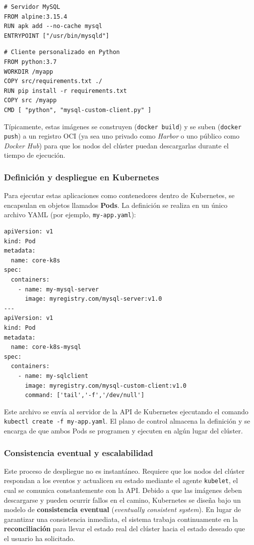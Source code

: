 \begin{verbatim}
# Servidor MySQL
FROM alpine:3.15.4
RUN apk add --no-cache mysql
ENTRYPOINT ["/usr/bin/mysqld"]
\end{verbatim}

\begin{verbatim}
# Cliente personalizado en Python
FROM python:3.7
WORKDIR /myapp
COPY src/requirements.txt ./
RUN pip install -r requirements.txt
COPY src /myapp
CMD [ "python", "mysql-custom-client.py" ]
\end{verbatim}

Típicamente, estas imágenes se construyen (\texttt{docker build}) y se suben (\texttt{docker push}) a un registro OCI (ya sea uno privado como \textit{Harbor} o uno público como \textit{Docker Hub}) para que los nodos del clúster puedan descargarlas durante el tiempo de ejecución.

\subsubsection{Definición y despliegue en Kubernetes}
Para ejecutar estas aplicaciones como contenedores dentro de Kubernetes, se encapsulan en objetos llamados \textbf{Pods}. La definición se realiza en un único archivo YAML (por ejemplo, \texttt{my-app.yaml}):

\begin{verbatim}
apiVersion: v1
kind: Pod
metadata:
  name: core-k8s
spec:
  containers:
    - name: my-mysql-server
      image: myregistry.com/mysql-server:v1.0
---
apiVersion: v1
kind: Pod
metadata:
  name: core-k8s-mysql
spec:
  containers:
    - name: my-sqlclient
      image: myregistry.com/mysql-custom-client:v1.0
      command: ['tail','-f','/dev/null']
\end{verbatim}

Este archivo se envía al servidor de la API de Kubernetes ejecutando el comando \texttt{kubectl create -f my-app.yaml}. El plano de control almacena la definición y se encarga de que ambos Pods se programen y ejecuten en algún lugar del clúster.

\subsubsection{Consistencia eventual y escalabilidad}
Este proceso de despliegue no es instantáneo. Requiere que los nodos del clúster respondan a los eventos y actualicen su estado mediante el agente \texttt{kubelet}, el cual se comunica constantemente con la API. Debido a que las imágenes deben descargarse y pueden ocurrir fallos en el camino, Kubernetes se diseña bajo un modelo de \textbf{consistencia eventual} (\textit{eventually consistent system}). En lugar de garantizar una consistencia inmediata, el sistema trabaja continuamente en la \textbf{reconciliación} para llevar el estado real del clúster hacia el estado deseado que el usuario ha solicitado.

